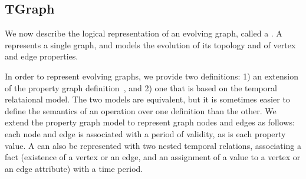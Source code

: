 \subsection{TGraph}

We now describe the logical representation of an evolving graph,
called a \tg.  A \tg represents a single graph, and models the
evolution of its topology and of vertex and edge properties.  

In order to represent evolving graphs, we provide two definitions: 1)
an extension of the property graph
definition~\cite{DBLP:journals/corr/AnglesABHRV16}, and 2) one that is
based on the temporal relataional model.  The two models are equivalent,
but it is sometimes easier to define the semantics of an operation
over one definition than the other.  We extend the property graph
model to represent graph nodes and edges as follows: each node and
edge is associated with a period of validity, as is each property
value.  A \tg can also be represented with two nested
temporal relations, associating a fact (existence of a vertex or an edge,
and an assignment of a value to a vertex or an edge attribute) with a
time period.

